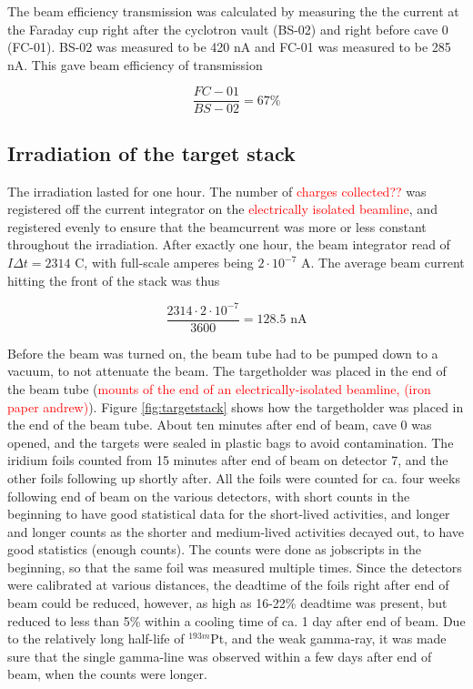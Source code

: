 \noindent
The beam efficiency transmission was calculated by measuring the the current at the Faraday cup right after the cyclotron vault (BS-02) and right before cave 0 (FC-01). BS-02 was measured to be 420 nA and FC-01 was measured to be 285 nA. This gave beam efficiency of transmission

$$\frac{FC-01}{BS-02}=67\% $$


\subsection{Irradiation of the target stack} \label{subsec:irradiation}
The irradiation lasted for one hour. The number of \textcolor{red}{charges collected??} was registered off the current integrator on the \textcolor{red}{electrically isolated beamline}, and registered evenly to ensure that the beamcurrent was more or less constant throughout the irradiation. After exactly one hour, the beam integrator read of $I\Delta t= 2314$ C, with full-scale amperes being $2\cdot10^{-7}$ A. The average beam current hitting the front of the stack was thus 

\begin{equation}
    \frac{2314\cdot 2\cdot10^{-7}}{3600 } = 128.5 \text{ nA}
\end{equation}

Before the beam was turned on, the beam tube had to be pumped down to a vacuum, to not attenuate the beam. The targetholder was placed in the end of the beam tube (\textcolor{red}{mounts of the end of an electrically-isolated beamline, (iron paper andrew)}). Figure \ref{fig:targetstack} shows how the targetholder was placed in the end of the beam tube. About ten minutes after end of beam, cave 0 was opened, and the targets were sealed in plastic bags to avoid contamination. The iridium foils counted from 15 minutes after end of beam on detector 7, and the other foils following up shortly after. All the foils were counted for ca. four weeks following end of beam on the various detectors, with short counts in the beginning to have good statistical data for the short-lived activities, and longer and longer counts as the shorter and medium-lived activities decayed out, to have good statistics (enough counts). The counts were done as jobscripts in the beginning, so that the same foil was measured multiple times.  Since the detectors were calibrated at various distances, the deadtime of the foils right after end of beam could be reduced, however, as high as  16-22\% deadtime was present, but reduced to less than 5\% within a cooling time of ca. 1 day after end of beam.
Due to the relatively long half-life of $^{193m}$Pt, and the weak gamma-ray, it was made sure that the single gamma-line was observed within a few days after end of beam, when the counts were longer. 

